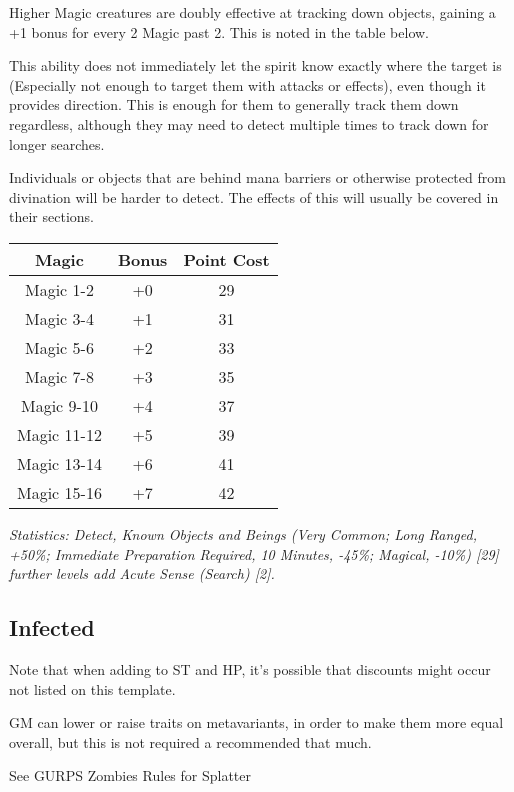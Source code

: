 \begin{multicols*}{3}
	Higher Magic creatures are doubly effective at tracking down objects, gaining a +1 bonus for every 2 Magic past 2. This is noted in the table below.
	
	This ability does not immediately let the spirit know exactly where the target is (Especially not enough to target them with attacks or effects), even though it provides direction. This is enough for them to generally track them down regardless, although they may need to detect multiple times to track down for longer searches.
	
	Individuals or objects that are behind mana barriers or otherwise protected from divination will be harder to detect. The effects of this will usually be covered in their sections. 
	
	\begin{center}
		\begin{tabular}{|c|c|c|}
			\hline
			Magic & Bonus & Point Cost\\
			\hline
			\hline
			Magic 1-2 & +0 & 29 \\
			Magic 3-4 & +1 & 31 \\
			Magic 5-6 & +2 & 33 \\
			Magic 7-8 & +3 & 35 \\
			Magic 9-10 & +4 & 37 \\
			Magic 11-12 & +5 & 39 \\
			Magic 13-14 & +6 & 41 \\
			Magic 15-16 & +7 & 42 \\
			\hline
		\end{tabular}
	\end{center}
	
	\textcolor{OliveGreen}{\textit{Statistics: Detect, Known Objects and Beings (Very Common; Long Ranged, +50\%; Immediate Preparation Required, 10 Minutes, -45\%; Magical, -10\%) [29] further levels add Acute Sense (Search) [2].}}
	
	\subsection{Infected}
	
	Note that when adding to ST and HP, it's possible that discounts might occur not listed on this template.
	
	GM can lower or raise traits on metavariants, in order to make them more equal overall, but this is not required a recommended that much.
	
	See GURPS Zombies Rules for Splatter
	

\end{multicols*}
